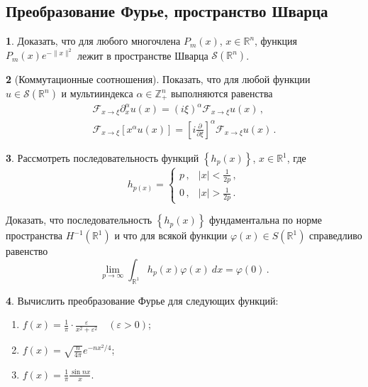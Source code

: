 \documentclass[a4paper, 12pt]{article}
\theoremstyle{definition}
\newtheorem{exercise}{}
\begin{document}
\subsection{Преобразование Фурье, пространство Шварца} %

\begin{exercise} %
    Доказать, что для любого многочлена \({ P_{m}(x) }\), \({ x \in \mathbb R^{n} }\), функция \({ P_{m}(x) e^{-\lVert x \rVert^2} }\) лежит в пространстве Шварца \({ \mathcal S(\mathbb R^{n}) }\).
\end{exercise}

\begin{exercise}[Коммутационные соотношения]
    Показать, что для любой функции \({ u \in \mathcal S(\mathbb R^{n}) }\) и мультииндекса \({ \alpha \in \mathbb Z_{+}^{n} }\) выполняются равенства
    \[
        \begin{gathered}
            \mathcal F_{x \to \xi} \partial_{x}^{\alpha} u(x) = (i\xi)^{\alpha} \mathcal F_{x \to \xi} u(x)\,, \\
            \mathcal F_{x \to \xi} \left[ x^{\alpha} u(x) \right] = \left[ i \frac{\partial}{\partial \xi} \right]^{\alpha} \mathcal F_{x \to \xi}u(x)\,.
        \end{gathered}
    \]
\end{exercise}

\begin{exercise} %
    Рассмотреть последовательность функций \({ \left\{ h_{p}(x) \right\} }\), \({ x \in \mathbb R^{1} }\), где \[
        h_{p(x)} = \begin{cases}
            p\,, & \lvert x \rvert < \frac{1}{2p}\,, \\
            0\,, & \lvert x \rvert > \frac{1}{2p}\,.
        \end{cases}
    \]

    Доказать, что последовательность \({ \left\{ h_{p}(x) \right\} }\) фундаментальна по норме пространства \({ H^{-1}(\mathbb R^{1}) }\) и что для всякой функции \({ \varphi(x) \in S(\mathbb R^{1}) }\) справедливо равенство \[
        \lim_{p \to \infty} \int_{\mathbb R^{1}} h_{p}(x) \varphi(x)\: dx = \varphi(0)\,.
    \]
\end{exercise}

\begin{exercise} %
    Вычислить преобразование Фурье для следующих функций:
    \begin{enumerate}
        \item \({ \displaystyle f(x) = \frac{1}{\pi} \cdot \frac{\varepsilon}{x^2 + \varepsilon^2} \quad (\varepsilon > 0) }\);
        \item \({ \displaystyle f(x) = \sqrt{\frac{n}{4\pi}} e^{-n x^2 / 4} }\);
        \item \({ \displaystyle f(x) = \frac{1}{\pi} \frac{\sin nx}{x} }\).
    \end{enumerate}
\end{exercise}
\end{document}
